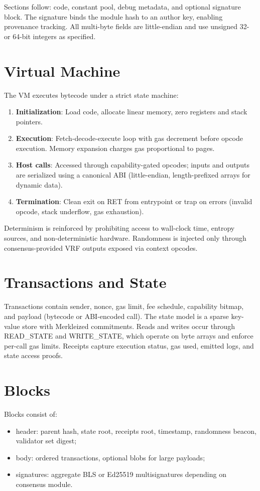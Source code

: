 \documentclass[11pt]{article}
\begin{document}
Sections follow: code, constant pool, debug metadata, and optional signature block. The signature binds the module hash to an author key, enabling provenance tracking. All multi-byte fields are little-endian and use unsigned 32- or 64-bit integers as specified.

\section{Virtual Machine}
The VM executes bytecode under a strict state machine:
\begin{enumerate}[noitemsep]
  \item \textbf{Initialization}: Load code, allocate linear memory, zero registers and stack pointers.
  \item \textbf{Execution}: Fetch-decode-execute loop with gas decrement before opcode execution. Memory expansion charges gas proportional to pages.
  \item \textbf{Host calls}: Accessed through capability-gated opcodes; inputs and outputs are serialized using a canonical ABI (little-endian, length-prefixed arrays for dynamic data).
  \item \textbf{Termination}: Clean exit on RET from entrypoint or trap on errors (invalid opcode, stack underflow, gas exhaustion).
\end{enumerate}

Determinism is reinforced by prohibiting access to wall-clock time, entropy sources, and non-deterministic hardware. Randomness is injected only through consensus-provided VRF outputs exposed via context opcodes.

\section{Transactions and State}
Transactions contain sender, nonce, gas limit, fee schedule, capability bitmap, and payload (bytecode or ABI-encoded call). The state model is a sparse key-value store with Merkleized commitments. Reads and writes occur through READ_STATE and WRITE_STATE, which operate on byte arrays and enforce per-call gas limits. Receipts capture execution status, gas used, emitted logs, and state access proofs.

\section{Blocks}
Blocks consist of:
\begin{itemize}[noitemsep]
  \item header: parent hash, state root, receipts root, timestamp, randomness beacon, validator set digest;
  \item body: ordered transactions, optional blobs for large payloads;
  \item signatures: aggregate BLS or Ed25519 multisignatures depending on consensus module.
\end{itemize}
\end{document}
